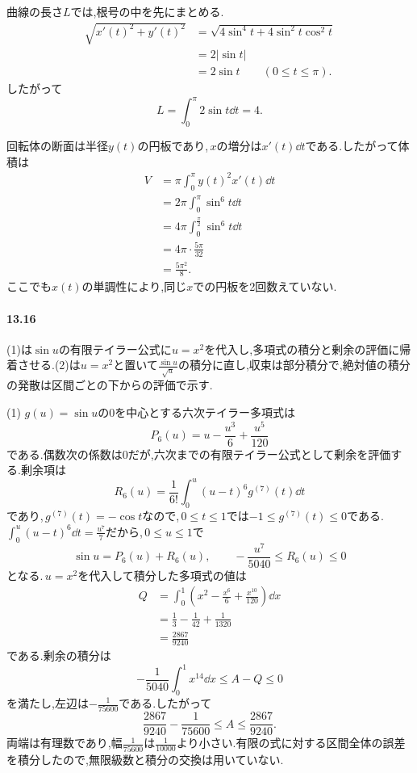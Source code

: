 曲線の長さ$L$では,根号の中を先にまとめる.
\[
 \begin{aligned}
 \sqrt{x'(t)^2+y'(t)^2}
 &=\sqrt{4\sin^4t+4\sin^2t\cos^2t}\\
 &=2|\sin t|\\
 &=2\sin t\qquad(0\le t\le\pi).
 \end{aligned}
\]
したがって
\[
 \boxed{L=\int_0^\pi2\sin t\dd t=4}.
\]

回転体の断面は半径$y(t)$の円板であり,\,$x$の増分は$x'(t)\dd t$である.したがって体積は
\[
 \begin{aligned}
 V&=\pi\int_0^\pi y(t)^2x'(t)\dd t\\
 &=2\pi\int_0^\pi\sin^6t\dd t\\
 &=4\pi\int_0^{\frac\pi2}\sin^6t\dd t\\
 &=4\pi\cdot\frac{5\pi}{32}\\
 &=\boxed{\frac{5\pi^2}{8}}.
 \end{aligned}
\]
ここでも$x(t)$の単調性により,同じ$x$での円板を2回数えていない.

\paragraph{13.16}
(1)は$\sin u$の有限テイラー公式に$u=x^2$を代入し,多項式の積分と剰余の評価に帰着させる.(2)は$u=x^2$と置いて$\frac{\sin u}{\sqrt u}$の積分に直し,収束は部分積分で,絶対値の積分の発散は区間ごとの下からの評価で示す.

(1) $g(u)=\sin u$の$0$を中心とする六次テイラー多項式は
\[
 P_6(u)=u-\frac{u^3}{6}+\frac{u^5}{120}
\]
である.偶数次の係数は$0$だが,六次までの有限テイラー公式として剰余を評価する.剰余項は
\[
 R_6(u)=\frac1{6!}\int_0^u(u-t)^6g^{(7)}(t)\dd t
\]
であり,\,$g^{(7)}(t)=-\cos t$なので,\,$0\le t\le1$では$-1\le g^{(7)}(t)\le0$である.\,$\int_0^u(u-t)^6\dd t=\frac{u^7}{7}$だから,\,$0\le u\le1$で
\[
 \sin u=P_6(u)+R_6(u),\qquad
 -\frac{u^7}{5040}\le R_6(u)\le0
\]
となる.\,$u=x^2$を代入して積分した多項式の値は
\[
 \begin{aligned}
 Q&=\int_0^1\left(x^2-\frac{x^6}{6}+\frac{x^{10}}{120}\right)\dd x\\
 &=\frac13-\frac1{42}+\frac1{1320}\\
 &=\frac{2867}{9240}
 \end{aligned}
\]
である.剰余の積分は
\[
 -\frac1{5040}\int_0^1x^{14}\dd x
 \le A-Q\le0
\]
を満たし,左辺は$-\frac1{75600}$である.したがって
\[
 \boxed{\frac{2867}{9240}-\frac1{75600}
 \le A\le\frac{2867}{9240}}.
\]
両端は有理数であり,幅$\frac1{75600}$は$\frac1{10000}$より小さい.有限の式に対する区間全体の誤差を積分したので,無限級数と積分の交換は用いていない.

